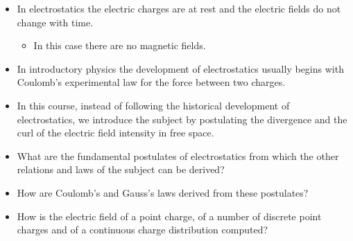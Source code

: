 \ELhold


\begin{ELunit}


\end{ELunit}

\ELhold


\begin{ELunit}

\begin{itemize}
\tightlist
\item
  In electrostatics the electric charges are at rest and the electric fields do not change with time.

  \begin{itemize}
  \tightlist
  \item
    In this case there are no magnetic fields.
  \end{itemize}
\item
  In introductory physics the development of electrostatics usually begins with Coulomb's experimental law for the force between two charges.
\item
  In this course, instead of following the historical development of electrostatics, we introduce the subject by postulating the divergence and the curl of the electric field intensity in free space.
\end{itemize}


\begin{itemize}
\tightlist
\item
  What are the fundamental postulates of electrostatics from which the other relations and laws of the subject can be derived?
\item
  How are Coulomb's and Gauss's laws derived from these postulates?
\item
  How is the electric field of a point charge, of a number of discrete point charges and of a continuous charge distribution computed?
\end{itemize}

\end{ELunit}

\ELhold


